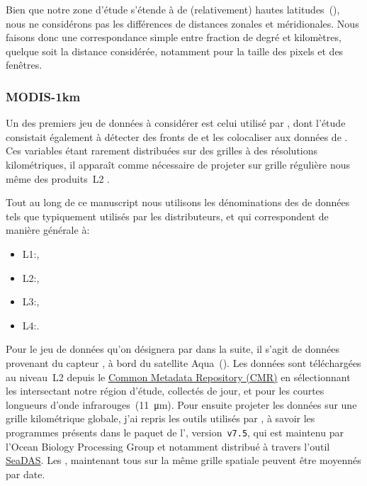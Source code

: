 \begin{note}
  Bien que notre zone d'étude s'étende à de (relativement) hautes latitudes~(), nous ne considérons pas les différences de distances zonales et méridionales.
  Nous faisons donc une correspondance simple entre fraction de degré et kilomètres, quelque soit la distance considérée, notamment pour la taille des pixels et des fenêtres.
\end{note}

\subsubsection{MODIS-1km}

Un des premiers jeu de données  à considérer est celui utilisé par \textcite{liu_2016}, dont l'étude consistait également à détecter des fronts de  et les colocaliser aux données de .
Ces variables étant rarement distribuées sur des grilles à des résolutions kilométriques, il apparaît comme nécessaire de projeter sur grille régulière nous même des produits~L2 .

\begin{note}
  Tout au long de ce manuscript nous utilisons les dénominations des  de données tels que typiquement utilisés par les distributeurs, et qui correspondent de manière générale à:
  \begin{itemize}
    \item L1:,
    \item L2:,
    \item L3:,
    \item L4:.
  \end{itemize}
\end{note}

Pour le jeu de données qu'on désignera par  dans la suite, il s'agit de données provenant du capteur , à bord du satellite Aqua~(\cite{kilpatrick_2015}).
Les données sont téléchargées au niveau~L2 depuis le \href{https://cmr.earthdata.nasa.gov/search/}{Common Metadata Repository (CMR)} en sélectionnant les  intersectant notre région d'étude, collectés de jour, et pour les courtes longueurs d'onde infrarouges~(\qty{11}{\um}).
Pour ensuite projeter les données sur une grille kilométrique globale, j'ai repris les outils utilisés par \citeauthor{liu_2016}, à savoir les programmes présents dans le paquet de l'\href{https://oceandata.sci.gsfc.nasa.gov/ocssw}{}, version~\verb|v7.5|, qui est maintenu par l'Ocean Biology Processing Group et notamment distribué à travers l'outil \href{https://seadas.gsfc.nasa.gov/}{SeaDAS}.
Les , maintenant tous sur la même grille spatiale peuvent être moyennés par date.

